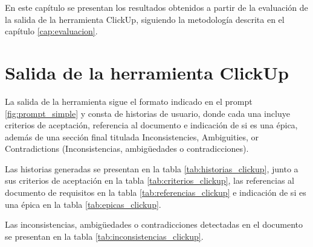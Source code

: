 En este capítulo se presentan los resultados obtenidos a partir de la evaluación de la salida de la herramienta ClickUp, siguiendo la metodología descrita en el capítulo \ref{cap:evaluacion}.

\section{Salida de la herramienta ClickUp}
La salida de la herramienta sigue el formato indicado en el prompt \ref{fig:prompt_simple} y consta de historias de usuario, donde cada una incluye criterios de aceptación, referencia al documento e indicación de si es una épica, además de una sección final titulada Inconsistencies, Ambiguities, or Contradictions (Inconsistencias, ambigüedades o contradicciones). 

Las historias generadas se presentan en la tabla \ref{tab:historias_clickup}, junto a sus criterios de aceptación en la tabla \ref{tab:criterios_clickup}, las referencias al documento de requisitos en la tabla \ref{tab:referencias_clickup} e indicación de si es una épica en la tabla \ref{tab:epicas_clickup}.

Las inconsistencias, ambigüedades o contradicciones detectadas en el documento se presentan en la tabla \ref{tab:inconsistencias_clickup}.

